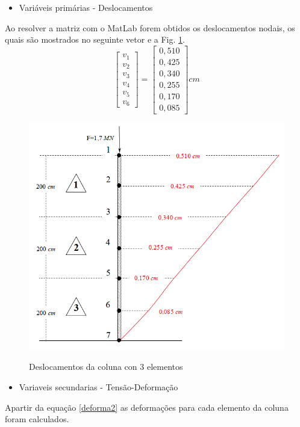 \documentclass{article} %
\begin{document}
\begin{itemize}
	\item Variáveis primárias - Deslocamentos
\end{itemize}

\indent Ao resolver a matriz com o MatLab forem obtidos os deslocamentos nodais, os quais são mostrados no seguinte vetor e a Fig. \ref{deslocamentos2}.
\begin{equation*}
\begin{bmatrix}
v_1\\
v_2\\
v_3\\
v_4\\
v_5\\
v_6
\end{bmatrix}=\begin{bmatrix}
0,510\\
0,425\\
0,340\\
0,255\\
0,170\\
0,085
\end{bmatrix}cm
\end{equation*}


\begin{figure}[H]
	\centering
	\caption{Deslocamentos da coluna con 3 elementos}
	\includegraphics[width=0.7\linewidth]{deslocamentos2}	
	\label{deslocamentos2}	
\end{figure}

\begin{itemize}
	\item Variaveis secundarias - Tensão-Deformação
\end{itemize}
\indent Apartir da equação \ref{deforma2} as deformações para cada elemento da coluna foram calculados.
\end{document}
